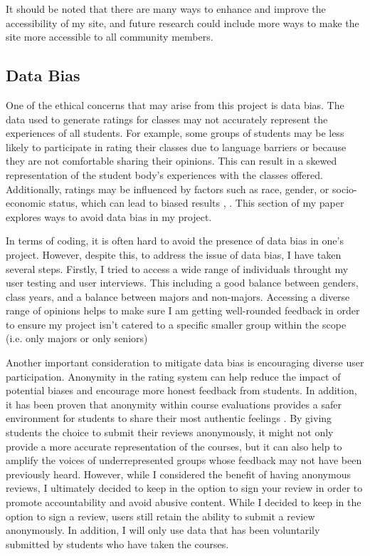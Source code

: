 \documentclass[10pt,twocolumn]{article}
\begin{document}
It should be noted that there are many ways to enhance and improve the accessibility of my site, and future research could include more ways to make the site more accessible to all community members.

\subsection{Data Bias}
One of the ethical concerns that may arise from this project is data bias. The data used to generate ratings for classes may not accurately represent the experiences of all students. For example, some groups of students may be less likely to participate in rating their classes due to language barriers or because they are not comfortable sharing their opinions. This can result in a skewed representation of the student body's experiences with the classes offered. Additionally, ratings may be influenced by factors such as race, gender, or socio-economic status, which can lead to biased results \cite{dubrovina23}, \cite{chae17}. This section of my paper explores ways to avoid data bias in my project.

In terms of coding, it is often hard to avoid the presence of data bias in one's project. However, despite this, to address the issue of data bias, I have taken several steps. Firstly, I tried to access a wide range of individuals throught my user testing and user interviews. This including a good balance between genders, class years, and a balance between majors and non-majors. Accessing a diverse range of opinions helps to make sure I am getting well-rounded feedback in order to ensure my project isn't catered to a specific smaller group within the scope (i.e. only majors or only seniors)

Another important consideration to mitigate data bias is encouraging diverse user participation. Anonymity in the rating system can help reduce the impact of potential biases and encourage more honest feedback from students. In addition, it has been proven that anonymity within course evaluations provides a safer environment for students to share their most authentic feelings \cite{ellis1984}. By giving students the choice to submit their reviews anonymously, it might not only provide a more accurate representation of the courses, but it can also help to amplify the voices of underrepresented groups whose feedback may not have been previously heard. However, while I considered the benefit of having anonymous reviews, I ultimately decided to keep in the option to sign your review in order to promote accountability and avoid abusive content. While I decided to keep in the option to sign a review, users still retain the ability to submit a review anonymously. In addition, I will only use data that has been voluntarily submitted by students who have taken the courses. 
\end{document}
